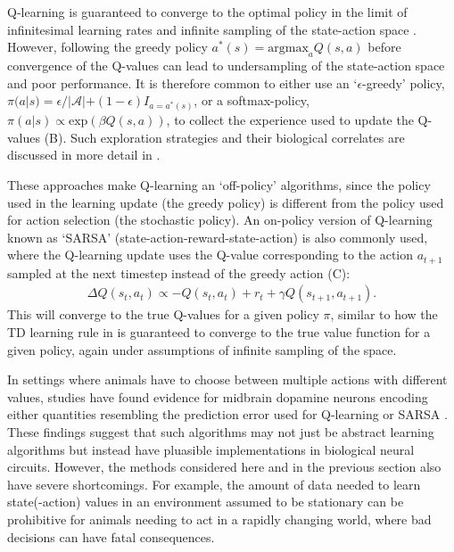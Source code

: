 Q-learning is guaranteed to converge to the optimal policy in the limit of infinitesimal learning rates and infinite sampling of the state-action space \citep{watkins1992q,sutton2018reinforcement}.
However, following the greedy policy $a^*(s) = \text{argmax}_{a} Q(s, a)$ before convergence of the Q-values can lead to undersampling of the state-action space and poor performance.
It is therefore common to either use an `$\epsilon$-greedy' policy, $\pi(a|s) = \epsilon / |\mathcal{A}| + (1-\epsilon) I_{a = a^*(s)}$, or a softmax-policy, $\pi(a|s) \propto \text{exp}(\beta Q(s, a))$, to collect the experience used to update the Q-values (B).
Such exploration strategies and their biological correlates are discussed in more detail in .

These approaches make Q-learning an `off-policy' algorithms, since the policy used in the learning update (the greedy policy) is different from the policy used for action selection (the stochastic policy).
An on-policy version of Q-learning known as `SARSA' (state-action-reward-state-action) is also commonly used, where the Q-learning update uses the Q-value corresponding to the action $a_{t+1}$ sampled at the next timestep instead of the greedy action (C):
\begin{align}
    \Delta  Q(s_t,a_t) \propto - Q(s_t,a_t) + r_t + \gamma Q(s_{t+1}, a_{t+1}).
\end{align}
This will converge to the true Q-values for a given policy $\pi$, similar to how the TD learning rule in  is guaranteed to converge to the true value function for a given policy, again under assumptions of infinite sampling of the space.

In settings where animals have to choose between multiple actions with different values, studies have found evidence for midbrain dopamine neurons encoding either quantities resembling the prediction error used for Q-learning \citep{roesch2007dopamine,niv2009reinforcement} or SARSA \citep{morris2006midbrain,niv2009reinforcement}.
These findings suggest that such algorithms may not just be abstract learning algorithms but instead have pluasible implementations in biological neural circuits.
However, the methods considered here and in the previous section also have severe shortcomings.
For example, the amount of data needed to learn state(-action) values in an environment assumed to be stationary can be prohibitive for animals needing to act in a rapidly changing world, where bad decisions can have fatal consequences.

